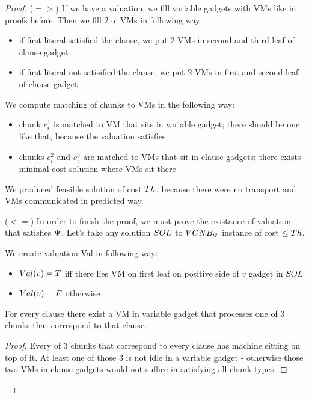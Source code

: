 \begin{proof} 
($=>$) If we have a valuation, we fill variable gadgets with VMs like in
proofs before. Then we fill $2 \cdot c$ VMs in following way:

\begin{itemize}
\item if first literal satisfied the clause, we put $2$ VMs in second and
third leaf of clause gadget
\item if first literal not satisified the clause, we put $2$ VMs in first
and second leaf of clause gadget
\end{itemize}

We compute matching of chunks to VMs in the following way:
\begin{itemize}
\item chunk $c_i^1$ is matched to VM that sits in variable gadget; there
should be one like that, because the valuation satisfies
\item chunks $c_i^2$ and $c_i^3$ are matched to VMs that sit in clause
gadgets; there exists minimal-cost solution where VMs sit there
\end{itemize}

We produced feasible solution of cost $Th$, because there were no
transport and VMs communicated in predicted way.

($<=$) In order to finish the proof, we must prove the existance of
valuation that satisfies $\Psi$. 
Let's take any solution $SOL$ to $VCNB_{\Psi}$ instance of cost $\leq Th$.

We create valuation Val in following way:
\begin{itemize}
\item $Val(v) = T$ iff there lies VM on first leaf on positive side of $v$ gadget in $SOL$
\item $Val(v) = F$ otherwise
\end{itemize}

\begin{lemma}For every clause there exist a VM in variable gadget that processes one of
  3 chunks that correspond to that clause.
\end{lemma}
\begin{proof}
 Every of $3$ chunks that correspond to every clause has machine sitting
on top of it. At least one of those $3$ is not idle in a variable gadget
- otherwise those two VMs in clause gadgets would not suffice in
satisfying all chunk types.\end{proof}


\end{proof}
